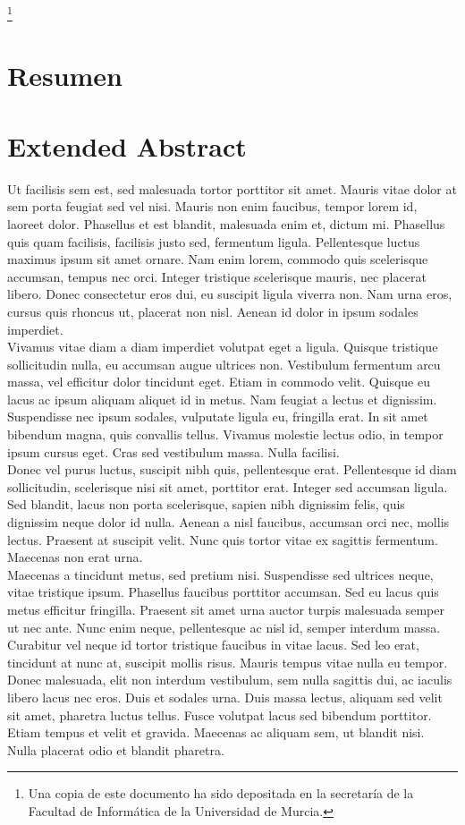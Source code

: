 \documentclass[11pt, spanish]{report}
\numberwithin{equation}{section}
\numberwithin{defin}{section}
\begin{document}
{\let\thefootnote\relax\footnote{{Una copia de este documento ha sido depositada en la secretaría de la Facultad de Informática de la Universidad de Murcia.}}}
\chapter*{Resumen}
\lipsum[1]

\chapter*{Extended Abstract}
Ut facilisis sem est, sed malesuada tortor porttitor sit amet. Mauris vitae dolor at sem porta feugiat sed vel nisi. Mauris non enim faucibus, tempor lorem id, laoreet dolor. Phasellus et est blandit, malesuada enim et, dictum mi. Phasellus quis quam facilisis, facilisis justo sed, fermentum ligula. Pellentesque luctus maximus ipsum sit amet ornare. Nam enim lorem, commodo quis scelerisque accumsan, tempus nec orci. Integer tristique scelerisque mauris, nec placerat libero. Donec consectetur eros dui, eu suscipit ligula viverra non. Nam urna eros, cursus quis rhoncus ut, placerat non nisl. Aenean id dolor in ipsum sodales imperdiet.\\

Vivamus vitae diam a diam imperdiet volutpat eget a ligula. Quisque tristique sollicitudin nulla, eu accumsan augue ultrices non. Vestibulum fermentum arcu massa, vel efficitur dolor tincidunt eget. Etiam in commodo velit. Quisque eu lacus ac ipsum aliquam aliquet id in metus. Nam feugiat a lectus et dignissim. Suspendisse nec ipsum sodales, vulputate ligula eu, fringilla erat. In sit amet bibendum magna, quis convallis tellus. Vivamus molestie lectus odio, in tempor ipsum cursus eget. Cras sed vestibulum massa. Nulla facilisi.\\

Donec vel purus luctus, suscipit nibh quis, pellentesque erat. Pellentesque id diam sollicitudin, scelerisque nisi sit amet, porttitor erat. Integer sed accumsan ligula. Sed blandit, lacus non porta scelerisque, sapien nibh dignissim felis, quis dignissim neque dolor id nulla. Aenean a nisl faucibus, accumsan orci nec, mollis lectus. Praesent at suscipit velit. Nunc quis tortor vitae ex sagittis fermentum. Maecenas non erat urna.\\

Maecenas a tincidunt metus, sed pretium nisi. Suspendisse sed ultrices neque, vitae tristique ipsum. Phasellus faucibus porttitor accumsan. Sed eu lacus quis metus efficitur fringilla. Praesent sit amet urna auctor turpis malesuada semper ut nec ante. Nunc enim neque, pellentesque ac nisl id, semper interdum massa. Curabitur vel neque id tortor tristique faucibus in vitae lacus. Sed leo erat, tincidunt at nunc at, suscipit mollis risus. Mauris tempus vitae nulla eu tempor. Donec malesuada, elit non interdum vestibulum, sem nulla sagittis dui, ac iaculis libero lacus nec eros. Duis et sodales urna. Duis massa lectus, aliquam sed velit sit amet, pharetra luctus tellus. Fusce volutpat lacus sed bibendum porttitor. Etiam tempus et velit et gravida. Maecenas ac aliquam sem, ut blandit nisi. Nulla placerat odio et blandit pharetra.\\
\end{document}

